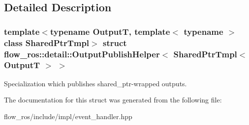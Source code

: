 \subsection{Detailed Description}
\subsubsection*{template$<$typename OutputT, template$<$ typename $>$ class Shared\+Ptr\+Tmpl$>$\newline
struct flow\+\_\+ros\+::detail\+::\+Output\+Publish\+Helper$<$ Shared\+Ptr\+Tmpl$<$ Output\+T $>$ $>$}

Specialization which publishes shared\+\_\+ptr-\/wrapped outputs. 

The documentation for this struct was generated from the following file\+:\begin{DoxyCompactItemize}
\item 
flow\+\_\+ros/include/impl/event\+\_\+handler.\+hpp\end{DoxyCompactItemize}
